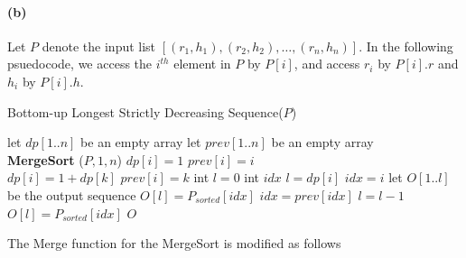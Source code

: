 \documentclass[12pt]{article}
\begin{document}
\paragraph{(b)} Let \(P\) denote the input list \([(r_1,h_1), (r_2,h_2), \hdots, (r_n,h_n)]\). In the following psuedocode, we access the \(i^{th}\) element in \(P\) by \(P[i]\), and access \(r_i\) by \(P[i].r\) and  \(h_i\) by \(P[i].h\).
\begin{algorithm}[H]
     \caption{Bottom-up Longest Strictly Decreasing Sequence(\(P\))}
     \begin{algorithmic}[1]
     \State let \(dp[1..n]\) be an empty array 
     \State let \(prev[1..n]\) be an empty array \\ 
     \State \textbf{MergeSort} (\(P, 1, n\)) 
          \State \(dp[i] = 1\)
          \State \(prev[i] = i\) 
               \\ 
                    \State \(dp[i] = 1 + dp[k]\)
                    \State \(prev[i] = k\)
               \EndIf
          \EndFor
     \EndFor
     \State int \(l = 0\)
     \State int \(idx\) 
               \State \(l = dp[i]\) 
               \State \(idx = i\) 
          \EndIf
     \EndFor
     \State let \(O[1..l]\) be the output sequence
          \State \(O[l] = P_{sorted}[idx]\)
          \State \(idx = prev[idx]\)
          \State \(l = l - 1\)
     \EndWhile
     \State \(O[l] = P_{sorted}[idx]\)
     \State \Return \(O\)
     \end{algorithmic}
\end{algorithm}
\noindent The Merge function for the MergeSort is modified as follows
\end{document}
